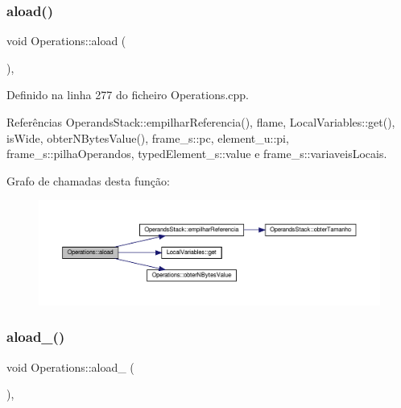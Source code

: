 \subsubsection{\texorpdfstring{aload()}{aload()}}
{\footnotesize\ttfamily void Operations\+::aload (\begin{DoxyParamCaption}{ }\end{DoxyParamCaption})\hspace{0.3cm}{\ttfamily [static]}, {\ttfamily [private]}}



Definido na linha 277 do ficheiro Operations.\+cpp.



Referências Operands\+Stack\+::empilhar\+Referencia(), flame, Local\+Variables\+::get(), is\+Wide, obter\+N\+Bytes\+Value(), frame\+\_\+s\+::pc, element\+\_\+u\+::pi, frame\+\_\+s\+::pilha\+Operandos, typed\+Element\+\_\+s\+::value e frame\+\_\+s\+::variaveis\+Locais.

Grafo de chamadas desta função\+:
\nopagebreak
\begin{figure}[H]
\begin{center}
\leavevmode
\includegraphics[width=350pt]{classOperations_a2f5c13146658e71de665c3b32ebed8c9_cgraph}
\end{center}
\end{figure}
\mbox{\label{classOperations_a9d821a16ef0681755717e8c4f740f6d0}} 
\subsubsection{\texorpdfstring{aload\+\_()}{aload\_0()}}
{\footnotesize\ttfamily void Operations\+::aload\+\_ (\begin{DoxyParamCaption}{ }\end{DoxyParamCaption})\hspace{0.3cm}{\ttfamily [static]}, {\ttfamily [private]}}



